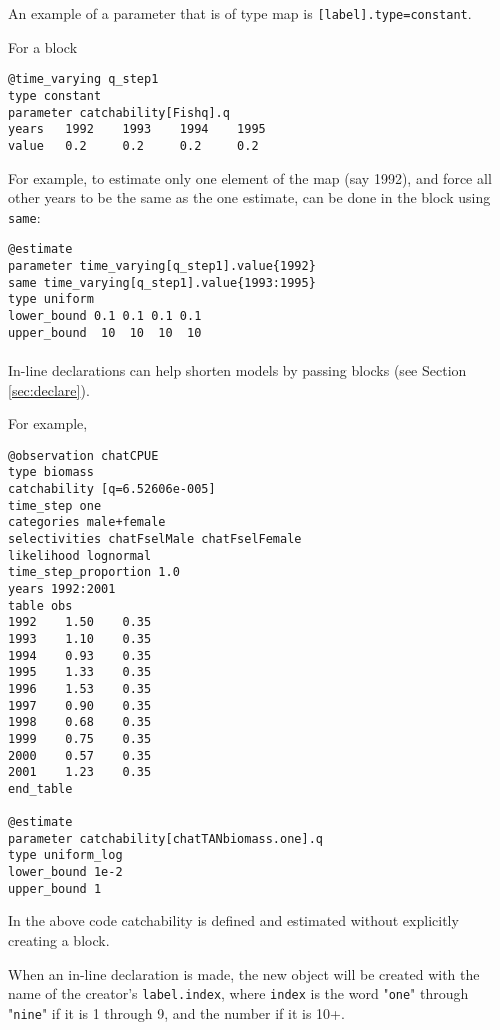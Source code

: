 An example of a parameter that is of type map is \texttt{[label].type=constant}.

For a  block

{\small{\begin{verbatim}
@time_varying q_step1
type constant
parameter catchability[Fishq].q
years 	1992	1993	1994	1995
value 	0.2		0.2		0.2		0.2
\end{verbatim}}}

For example, to estimate only one element of the map (say 1992), and force all other years to be the same as the one estimate, can be done in the  block using \texttt{same}:

{\small{\begin{verbatim}
@estimate
parameter time_varying[q_step1].value{1992}
same time_varying[q_step1].value{1993:1995}
type uniform
lower_bound 0.1 0.1 0.1 0.1
upper_bound  10  10  10  10
\end{verbatim}}}

\paragraph*{}

In-line declarations can help shorten models by passing \command{} blocks (see Section \ref{sec:declare}).

For example,

{\small{\begin{verbatim}
@observation chatCPUE
type biomass
catchability [q=6.52606e-005]
time_step one
categories male+female
selectivities chatFselMale chatFselFemale
likelihood lognormal
time_step_proportion 1.0
years 1992:2001
table obs
1992    1.50    0.35
1993    1.10    0.35
1994    0.93    0.35
1995    1.33    0.35
1996    1.53    0.35
1997    0.90    0.35
1998    0.68    0.35
1999    0.75    0.35
2000    0.57    0.35
2001    1.23    0.35
end_table

@estimate
parameter catchability[chatTANbiomass.one].q
type uniform_log
lower_bound 1e-2
upper_bound 1
\end{verbatim}}}

In the above code catchability is defined and estimated without explicitly creating a  block.

When an in-line declaration is made, the new object will be created with the name of the creator's \texttt{label.index}, where \texttt{index} is the word "\texttt{one}" through "\texttt{nine}" if it is 1 through 9, and the number if it is 10+.

